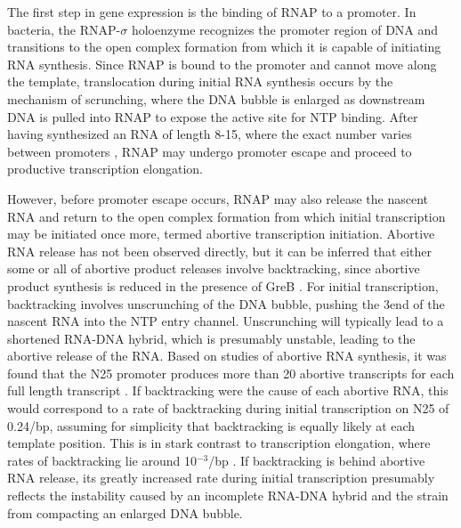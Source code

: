%
The first step in gene expression is the binding of RNAP to a promoter. In
bacteria, the RNAP-$\sigma$ holoenzyme recognizes the promoter region of DNA
and transitions to the open complex formation from which it is capable of
initiating RNA synthesis. Since RNAP is bound to the promoter and cannot move
along the template, translocation during initial RNA synthesis occurs by the
mechanism of scrunching, where the DNA bubble is enlarged as downstream DNA is
pulled into RNAP to expose the active site for NTP binding. After having
synthesized an RNA of length 8-15, where the exact number varies between
promoters
\cite{carpousis_cycling_1980,hsu_vitro_2003,tang_real-time_2009,hsu_initial_2006},
RNAP may undergo promoter escape and proceed to productive transcription
elongation.

However, before promoter escape occurs, RNAP may also release the
nascent RNA and return to the open complex formation from which initial
transcription may be initiated once more, termed abortive
transcription initiation. Abortive RNA release has not been observed directly,
but it can be inferred that either some or all of abortive product releases
involve backtracking, since abortive product synthesis is reduced in the
presence of GreB
\cite{hsu_escherichia_1995,feng_grea-induced_1994,hsu_initial_2006}. For
initial transcription, backtracking involves unscrunching of the DNA bubble,
pushing the 3\ppp end of the nascent RNA into the NTP entry channel.
Unscrunching will typically lead to a shortened RNA-DNA hybrid, which is
presumably unstable, leading to the abortive release of the RNA. Based on
studies of abortive RNA synthesis, it was found that the N25 promoter produces
more than 20 abortive transcripts for each full length transcript
\cite{hsu_initial_2006}. If backtracking were the cause of each abortive RNA,
this would correspond to a rate of backtracking during initial transcription
on N25 of 0.24/bp, assuming for simplicity that backtracking is equally
likely at each template position. This is in stark contrast to transcription
elongation, where rates of backtracking lie around 10$^{-3}$/bp
\cite{shaevitz_backtracking_2003}. If backtracking is behind abortive RNA
release, its greatly increased rate during initial transcription presumably
reflects the instability caused by an incomplete RNA-DNA hybrid and the strain
from compacting an enlarged DNA bubble.

